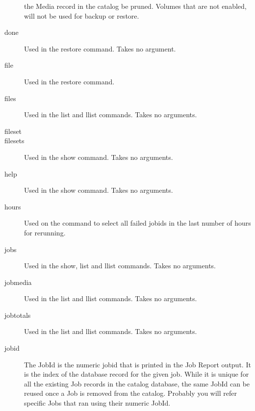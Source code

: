 \begin{description}
  the Media record in the catalog be pruned. Volumes that are not enabled,
  will not be used for backup or restore.
\item [done]
  Used in the restore command. Takes no argument.
\item [file]
  Used in the restore command.
\item [files]
  Used in the list and llist commands. Takes no arguments.
\item [fileset]
\item [filesets]
  Used in the show command. Takes no arguments.
\item [help]
  Used in the show command. Takes no arguments.
\item [hours]
  Used on the   command to select all failed jobids in the last number of hours for rerunning.
\item [jobs]
  Used in the show, list and llist commands. Takes no arguments.
\item [jobmedia]
  Used in the list and llist commands. Takes no arguments.
\item [jobtotals]
  Used in the list and llist commands. Takes no arguments.
\item [jobid]
  The JobId is the numeric jobid that is printed in the Job
  Report output. It is the index of the database record for the
  given job. While it is unique for all the existing Job records
  in the catalog database, the same JobId can be reused once a
  Job is removed from the catalog. Probably you will refer
  specific Jobs that ran using their numeric JobId.


\end{description}
